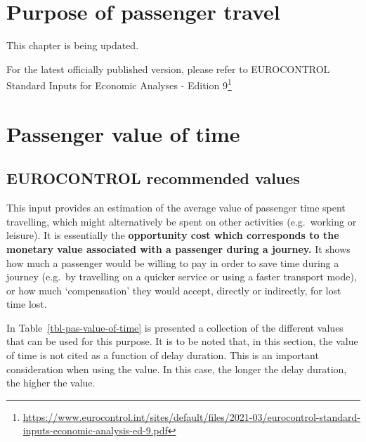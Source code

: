 \documentclass[
  11pt,
  a4paper,
]{book}
\DeclareRobustCommand{\href}[2]{#2\footnote{\url{#1}}}
\begin{document}
\hypertarget{sec-purpose-of-passenger-travel}{%
\chapter{Purpose of passenger
travel}\label{sec-purpose-of-passenger-travel}}

This chapter is being updated.

For the latest officially published version, please refer to
\href{https://www.eurocontrol.int/sites/default/files/2021-03/eurocontrol-standard-inputs-economic-analysis-ed-9.pdf}{EUROCONTROL
Standard Inputs for Economic Analyses - Edition 9}

\hypertarget{sec-passenger-value-of-time}{%
\chapter{Passenger value of time}\label{sec-passenger-value-of-time}}

\hypertarget{eurocontrol-recommended-values-15}{%
\section{EUROCONTROL recommended
values}\label{eurocontrol-recommended-values-15}}

This input provides an estimation of the average value of passenger time
spent travelling, which might alternatively be spent on other activities
(e.g.~working or leisure). It is essentially the \textbf{opportunity
cost which corresponds to the monetary value associated with a passenger
during a journey.} It shows how much a passenger would be willing to pay
in order to save time during a journey (e.g.~by travelling on a quicker
service or using a faster transport mode), or how much `compensation'
they would accept, directly or indirectly, for lost time lost.

In Table~\ref{tbl-pas-value-of-time} is presented a collection of the
different values that can be used for this purpose. It is to be noted
that, in this section, the value of time is not cited as a function of
delay duration. This is an important consideration when using the value.
In this case, the longer the delay duration, the higher the value.
\end{document}
